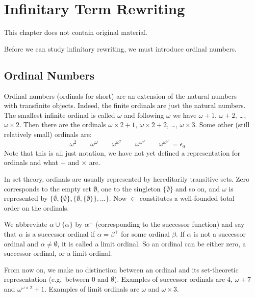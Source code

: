 \chapter{Infinitary Term Rewriting}\label{chap:rewriting}

This chapter does not contain original material.

Before we can study infinitary rewriting, we must introduce ordinal numbers.



\section{Ordinal Numbers}


Ordinal numbers (ordinals for short) are an extension of the natural numbers
with transfinite objects. Indeed, the finite ordinals are just the natural
numbers. The smallest infinite ordinal is called $\omega$ and following
$\omega$ we have $\omega + 1$, $\omega + 2$, \ldots, $\omega \times 2$. Then
there are the ordinals $\omega \times 2 + 1$, $\omega \times 2 + 2$, \ldots,
$\omega \times 3$. Some other (still relatively small) ordinals are:
\begin{displaymath}
  \omega^2 \qquad
  \omega^\omega \qquad
  \omega^{\omega^2} \qquad
  \omega^{\omega^\omega} \qquad
  \omega^{\omega^{\omega^{\iddots}}} = \epsilon_0 %
\end{displaymath}
Note that this is all just notation, we have not yet defined a representation
for ordinals and what $+$ and $\times$ are.

In set theory, ordinals are usually represented by hereditarily transitive
sets. Zero corresponds to the empty set $\emptyset$, one to the singleton $\{
\emptyset \}$ and so on, and $\omega$ is represented by $\{ \emptyset, \{
\emptyset \}, \{ \emptyset, \{ \emptyset \} \} , \ldots \}$. Now $\in$
constitutes a well-founded total order on the ordinals.

We abbreviate $\alpha \cup \{ \alpha \}$ by $\alpha^+$ (corresponding to the
successor function) and say that $\alpha$ is a successor ordinal if $\alpha =
\beta^+$ for some ordinal $\beta$. If $\alpha$ is not a successor ordinal and
$\alpha \neq \emptyset$, it is called a limit ordinal. So an ordinal can
be either zero, a successor ordinal, or a limit ordinal.

From now on, we make no distinction between an ordinal and its set-theoretic
representation (e.g.\ between $0$ and $\emptyset$). Examples of successor
ordinals are $4$, $\omega + 7$  and $\omega^{\omega \times 2} + 1$. Examples
of limit ordinals are $\omega$ and $\omega \times 3$.

